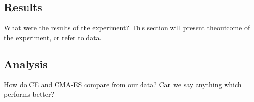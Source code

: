\subsection{Results}

What were the results of the experiment? This section will
present theoutcome of the experiment, or refer to data.

\subsection{Analysis}

How do CE and CMA-ES compare from our data? Can we say anything 
which performs better?

